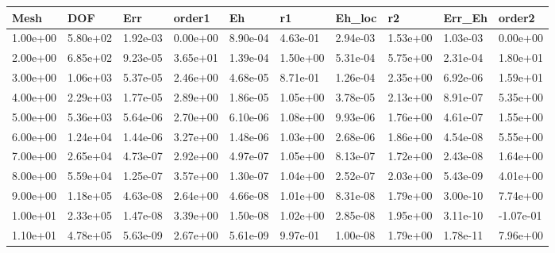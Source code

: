 \begin{tabular}{llllllllll}
Mesh & DOF & Err & order1 & Eh & r1 & Eh_loc & r2 & Err_Eh & order2 \\ 
\hline 
1.00e+00 & 5.80e+02 & 1.92e-03 & 0.00e+00 & 8.90e-04 & 4.63e-01 & 2.94e-03 & 1.53e+00 & 1.03e-03 &  0.00e+00 \\ 
2.00e+00 & 6.85e+02 & 9.23e-05 & 3.65e+01 & 1.39e-04 & 1.50e+00 & 5.31e-04 & 5.75e+00 & 2.31e-04 &  1.80e+01 \\ 
3.00e+00 & 1.06e+03 & 5.37e-05 & 2.46e+00 & 4.68e-05 & 8.71e-01 & 1.26e-04 & 2.35e+00 & 6.92e-06 &  1.59e+01 \\ 
4.00e+00 & 2.29e+03 & 1.77e-05 & 2.89e+00 & 1.86e-05 & 1.05e+00 & 3.78e-05 & 2.13e+00 & 8.91e-07 &  5.35e+00 \\ 
5.00e+00 & 5.36e+03 & 5.64e-06 & 2.70e+00 & 6.10e-06 & 1.08e+00 & 9.93e-06 & 1.76e+00 & 4.61e-07 &  1.55e+00 \\ 
6.00e+00 & 1.24e+04 & 1.44e-06 & 3.27e+00 & 1.48e-06 & 1.03e+00 & 2.68e-06 & 1.86e+00 & 4.54e-08 &  5.55e+00 \\ 
7.00e+00 & 2.65e+04 & 4.73e-07 & 2.92e+00 & 4.97e-07 & 1.05e+00 & 8.13e-07 & 1.72e+00 & 2.43e-08 &  1.64e+00 \\ 
8.00e+00 & 5.59e+04 & 1.25e-07 & 3.57e+00 & 1.30e-07 & 1.04e+00 & 2.52e-07 & 2.03e+00 & 5.43e-09 &  4.01e+00 \\ 
9.00e+00 & 1.18e+05 & 4.63e-08 & 2.64e+00 & 4.66e-08 & 1.01e+00 & 8.31e-08 & 1.79e+00 & 3.00e-10 &  7.74e+00 \\ 
1.00e+01 & 2.33e+05 & 1.47e-08 & 3.39e+00 & 1.50e-08 & 1.02e+00 & 2.85e-08 & 1.95e+00 & 3.11e-10 & -1.07e-01 \\ 
1.10e+01 & 4.78e+05 & 5.63e-09 & 2.67e+00 & 5.61e-09 & 9.97e-01 & 1.00e-08 & 1.79e+00 & 1.78e-11 &  7.96e+00 \\ 
\hline 
\end{tabular}